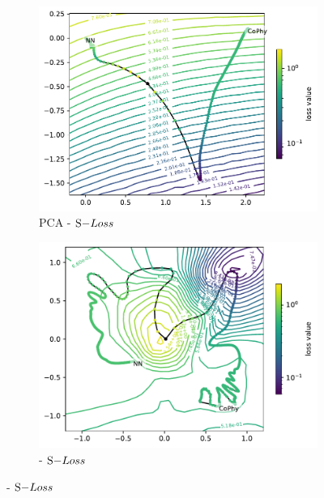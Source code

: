 \documentclass[letterpaper]{article} %
\begin{document}
\begin{figure}[htp]
         
              \begin{subfigure}[b]{0.3\textwidth}
                \includegraphics[width=\textwidth]{figures/round3/both_PCA/directions.h5_proj_cos_e_total.h5_total_e_loss_2dcontour_proj.pdf}
                \caption{PCA - $\eloss{}$ }
                \label{fig:elossPCA}
              \end{subfigure}
              \begin{subfigure}[b]{0.3\textwidth}
                \includegraphics[width=\textwidth]{figures/round3/both_NV/map_e_total_loss.pdf}
                \caption{\proposedautencoder{} - $\eloss{}$  }
                \label{fig:elossmine}
              \end{subfigure}
         

\end{figure}
\end{document}
